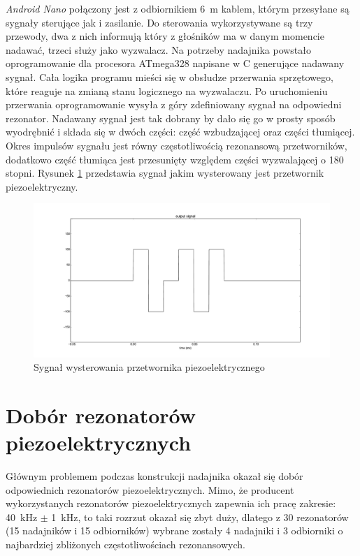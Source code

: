 

\textit{Android Nano} połączony jest z odbiornikiem \SI{6}{m} kablem, którym przesyłane są sygnały sterujące jak i zasilanie.
Do sterowania wykorzystywane są trzy przewody, dwa z nich informują który z głośników ma w danym momencie nadawać,
trzeci służy jako wyzwalacz. 
Na potrzeby nadajnika powstało oprogramowanie dla procesora ATmega328 napisane w C generujące nadawany sygnał.
Cała logika programu mieści się w obsłudze przerwania sprzętowego, które reaguje na zmianą stanu logicznego
na wyzwalaczu.
Po uruchomieniu przerwania oprogramowanie wysyła z góry zdefiniowany sygnał na odpowiedni rezonator. 
Nadawany sygnał jest tak dobrany by dało się go w prosty sposób wyodrębnić i składa się w dwóch
części: część wzbudzającej oraz części tłumiącej.
Okres impulsów sygnału jest równy częstotliwością rezonansową przetworników, dodatkowo część tłumiąca
jest przesunięty względem części wyzwalającej o 180 stopni.  
Rysunek \ref{fig:output_signal} przedstawia sygnał jakim wysterowany jest przetwornik piezoelektryczny. 


\begin{figure}[h!]
    \centering
    \includegraphics[width=1.15\textwidth, trim= 47mm 0mm 0mm 0mm,clip]{output_signal}
    \caption{Sygnał wysterowania przetwornika piezoelektrycznego}
    \label{fig:output_signal}
\end{figure}

\newpage

\section{Dobór rezonatorów piezoelektrycznych}

Głównym problemem podczas konstrukcji nadajnika okazał się dobór odpowiednich rezonatorów piezoelektrycznych.
Mimo, że producent wykorzystanych rezonatorów piezoelektrycznych zapewnia ich pracę zakresie: \SI{40}{kHz} $\pm$ \SI{1}{kHz},
to taki rozrzut okazał się zbyt duży, 
dlatego z 30 rezonatorów (15 nadajników i 15 odbiorników) wybrane zostały 4 nadajniki i 3 odbiorniki o najbardziej 
zbliżonych częstotliwościach rezonansowych.


